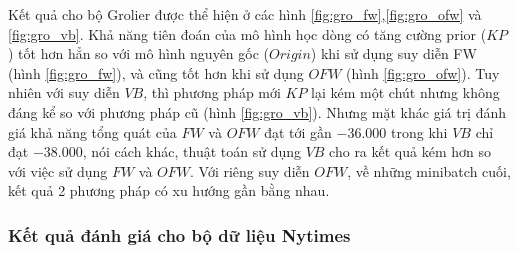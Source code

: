 \documentclass[fontsize=13pt]{scrartcl}
\begin{document}
\par Kết quả cho bộ Grolier được thể hiện ở các hình \ref{fig:gro_fw},\ref{fig:gro_ofw} và \ref{fig:gro_vb}. Khả năng tiên đoán của mô hình học dòng có tăng cường prior ($KP$) tốt hơn hẳn so với mô hình nguyên gốc ($Origin$) khi sử dụng suy diễn FW (hình \ref{fig:gro_fw}), và cũng tốt hơn khi sử dụng $OFW$ (hình \ref{fig:gro_ofw}). Tuy nhiên với suy diễn $VB$, thì phương pháp mới $KP$ lại kém một chút nhưng không đáng kể so với phương pháp cũ (hình \ref{fig:gro_vb}). Nhưng mặt khác giá trị đánh giá khả năng tổng quát của $FW$ và $OFW$ đạt tới gần $-36.000$ trong khi $VB$ chỉ đạt $-38.000$, nói cách khác, thuật toán sử dụng $VB$ cho ra kết quả kém hơn so với việc sử dụng $FW$ và $OFW$. Với riêng suy diễn $OFW$, về những minibatch cuối, kết quả 2 phương pháp có xu hướng gần bằng nhau. 
\subsubsection{Kết quả đánh giá cho bộ dữ liệu Nytimes}
\end{document}
